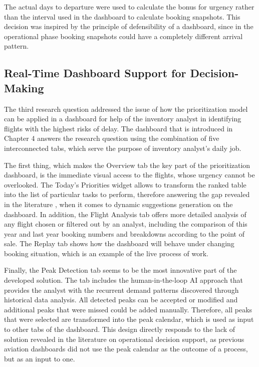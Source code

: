 The actual days to departure were used to calculate the bonus for urgency rather than the interval used in the dashboard to calculate booking snapshots. This decision was inspired by the principle of defensibility of a dashboard, since in the operational phase booking snapshots could have a completely different arrival pattern.

\subsection{Real-Time Dashboard Support for Decision-Making}

The third research question addressed the issue of how the prioritization model can be applied in a dashboard for help of the inventory analyst in identifying flights with the highest risks of delay. The dashboard that is introduced in Chapter 4 answers the research question using the combination of five interconnected tabs, which serve the purpose of inventory analyst's daily job.

The first thing, which makes the Overview tab the key part of the prioritization dashboard, is the immediate visual access to the flights, whose urgency cannot be overlooked. The Today's Priorities widget allows to transform the ranked table into the list of particular tasks to perform, therefore answering the gap revealed in the literature \citep{Rouhani2016}, when it comes to dynamic suggestions generation on the dashboard. In addition, the Flight Analysis tab offers more detailed analysis of any flight chosen or filtered out by an analyst, including the comparison of this year and last year booking numbers and breakdowns according to the point of sale. The Replay tab shows how the dashboard will behave under changing booking situation, which is an example of the live process of work.

Finally, the Peak Detection tab seems to be the most innovative part of the developed solution. The tab includes the human-in-the-loop AI approach that provides the analyst with the recurrent demand patterns discovered through historical data analysis. All detected peaks can be accepted or modified and additional peaks that were missed could be added manually. Therefore, all peaks that were selected are transformed into the peak calendar, which is used as input to other tabs of the dashboard. This design directly responds to the lack of solution revealed in the literature on operational decision support, as previous aviation dashboards did not use the peak calendar as the outcome of a process, but as an input to one.

